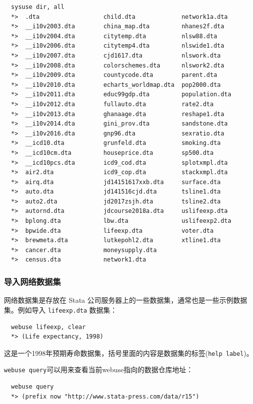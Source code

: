\documentclass[cn,fancy,blue,11pt]{elegantbook}
\begin{document}
\begin{lstlisting}
  sysuse dir, all
  *>  .dta                  child.dta             network1a.dta
  *>  __i10v2003.dta        china_map.dta         nhanes2f.dta
  *>  __i10v2004.dta        citytemp.dta          nlsw88.dta
  *>  __i10v2006.dta        citytemp4.dta         nlswide1.dta
  *>  __i10v2007.dta        cjd1617.dta           nlswork.dta
  *>  __i10v2008.dta        colorschemes.dta      nlswork2.dta
  *>  __i10v2009.dta        countycode.dta        parent.dta
  *>  __i10v2010.dta        echarts_worldmap.dta  pop2000.dta
  *>  __i10v2011.dta        educ99gdp.dta         population.dta
  *>  __i10v2012.dta        fullauto.dta          rate2.dta
  *>  __i10v2013.dta        ghanaage.dta          reshape1.dta
  *>  __i10v2014.dta        gini_prov.dta         sandstone.dta
  *>  __i10v2016.dta        gnp96.dta             sexratio.dta
  *>  __icd10.dta           grunfeld.dta          smoking.dta
  *>  __icd10cm.dta         houseprice.dta        sp500.dta
  *>  __icd10pcs.dta        icd9_cod.dta          splotxmpl.dta
  *>  air2.dta              icd9_cop.dta          stackxmpl.dta
  *>  airq.dta              jd14151617xxb.dta     surface.dta
  *>  auto.dta              jd141516cjd.dta       tsline1.dta
  *>  auto2.dta             jd2017zsjh.dta        tsline2.dta
  *>  autornd.dta           jdcourse2018a.dta     uslifeexp.dta
  *>  bplong.dta            lbw.dta               uslifeexp2.dta
  *>  bpwide.dta            lifeexp.dta           voter.dta
  *>  brewmeta.dta          lutkepohl2.dta        xtline1.dta
  *>  cancer.dta            moneysupply.dta
  *>  census.dta            network1.dta
\end{lstlisting}

\subsubsection{导入网络数据集}

网络数据集是存放在 Stata 公司服务器上的一些数据集，通常也是一些示例数据集。例如导入 \texttt{lifeexp.dta} 数据集：

\begin{lstlisting}
  webuse lifeexp, clear
  *> (Life expectancy, 1998)
\end{lstlisting}

这是一个1998年预期寿命数据集，括号里面的内容是数据集的标签(\lstinline{help label})。

\lstinline{webuse query}可以用来查看当前webuse指向的数据仓库地址：

\begin{lstlisting}
  webuse query
  *> (prefix now "http://www.stata-press.com/data/r15")
\end{lstlisting}
\end{document}
